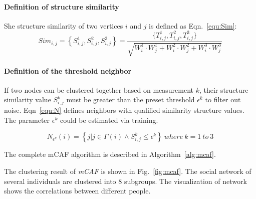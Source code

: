 \documentclass{mcmthesis}
\begin{document}
\paragraph{Definition of structure similarity} She structure similarity of two vertices $i$ and $j$ is defined as Eqn.~\eqref{equ:Sim}:
\begin{equation}\label{equ:Sim}
Sim_{i,j}=\left\{S_{i,j}^1, S_{i,j}^2, S_{i,j}^3\right\}=\frac{\{T_{i,j}^1, T_{i,j}^2, T_{i,j}^3\}}{\sqrt{W_i^1\cdot W_j^1+W_i^2\cdot W_j^2+W_i^3\cdot W_j^3}}
\end{equation}

\paragraph{Definition of the threshold neighbor} If two nodes can be clustered together based on measurement $k$, their structure similarity value $S^k_{i,j}$ must be greater than the preset threshold $\epsilon^k$ to filter out noise. Eqn~\eqref{equ:N} defines neighbors with qualified similarity structure values. The parameter $\epsilon^k$ could be estimated via training. 

\begin{equation}\label{equ:N}
N_{\epsilon^k}(i)=\left\{j|j\in \varGamma(i) \wedge S_{i,j}^k \leq \epsilon^k \right\}\ where\ k=1\ to\ 3
\end{equation}

The complete mCAF algorithm is described in Algorithm~\ref{alg:mcaf}.

The clustering result of \emph{mCAF} is shown in Fig.~\ref{fig:mcaf}. The social network of several individuals are clustered into 8 subgroups. The visualization of network shows the correlations between different people.
\end{document}
